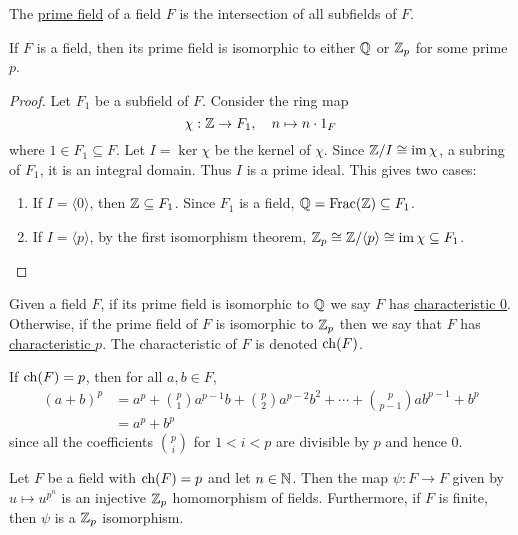 \documentclass[11pt]{article}
\begin{document}
\begin{definition}
    The \ul{prime field} of a field $F$ is the intersection of all subfields of $F$.
\end{definition}

\begin{theorem}
    If $F$ is a field, then its prime field is isomorphic to either $\mathbb{Q}$ or $\mathbb{Z}_p$ for some prime $p$.
\end{theorem}

\begin{proof}
    Let $F_1$ be a subfield of $F$. Consider the ring map
    \[\chi:\mathbb{Z}\to F_1,\quad n\mapsto n\cdot1_F\]
    where $1\in F_1\subseteq F$. Let $I=\ker\chi$ be the kernel of $\chi$. Since $\mathbb{Z}/I\cong\operatorname{im}\chi$, a subring of $F_1$, it is an integral domain. Thus $I$ is a prime ideal. This gives two cases:
    \begin{enumerate}
        \item If $I=\langle0\rangle$, then $\mathbb{Z}\subseteq F_1$. Since $F_1$ is a field, $\mathbb{Q}=\text{Frac}(\mathbb{Z})\subseteq F_1$.
        \item If $I=\langle p\rangle$, by the first isomorphism theorem, $\mathbb{Z}_p\cong\mathbb{Z}/\langle p\rangle\cong\operatorname{im}\chi\subseteq F_1$.
    \end{enumerate}
\end{proof}

\begin{definition}
    Given a field $F$, if its prime field is isomorphic to $\mathbb{Q}$ we say $F$ has \ul{characteristic 0}. Otherwise, if the prime field of $F$ is isomorphic to $\mathbb{Z}_p$ then we say that $F$ has \ul{characteristic $p$}. The characteristic of $F$ is denoted $\operatorname{ch}(F)$.
\end{definition}

\begin{note}
    If $\operatorname{ch}(F)=p$, then for all $a,b\in F$,
    \begin{align*}
        (a+b)^p&=a^p+\binom{p}{1}a^{p-1}b+\binom{p}{2}a^{p-2}b^2+\cdots+\binom{p}{p-1}ab^{p-1}+b^p \\
        &=a^p+b^p
    \end{align*}
    since all the coefficients $\binom{p}{i}$ for $1<i<p$ are divisible by $p$ and hence 0.
\end{note}

\begin{proposition}
    Let $F$ be a field with $\operatorname{ch}(F)=p$ and let $n\in\mathbb{N}$. Then the map $\psi:F\to F$ given by $u\mapsto u^{p^n}$ is an injective $\mathbb{Z}_p$ homomorphism of fields. Furthermore, if $F$ is finite, then $\psi$ is a $\mathbb{Z}_p$ isomorphism.
\end{proposition}
\end{document}
